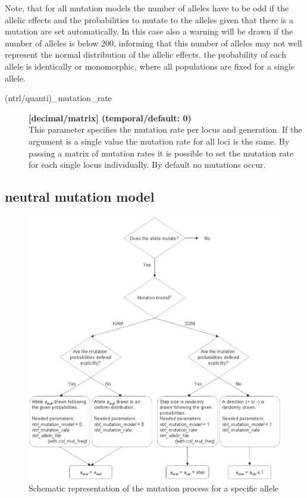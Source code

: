 \documentclass[letterpaper,12pt,oneside]{book}
\begin{document}
Note, that for all mutation models the number of alleles have to be odd if the allelic effects and the probabilities to mutate to the alleles given that there is a mutation are set automatically. In this case also a warning will be drawn if the number of alleles is below 200, informing that this number of alleles may not well represent the normal distribution of the allelic effects.
the probability of each allele is identically or monomorphic, where all populations are fixed for a single allele.   
\begin{description}
\item[(ntrl/quanti)\_mutation\_rate] \textbf{[decimal/matrix] (temporal/default: 0)}\\
This parameter specifies the mutation rate per locus and generation. If the argument is a single value the mutation rate for all loci is the same. By passing a matrix of mutation rates it is possible to set the mutation rate for each single locus individually. By default no mutations occur.

\end{description}
\subsection{neutral mutation model}

\begin{figure}[htbp]
	\centering
		\includegraphics[width=1\textwidth]{mutation-ntrl.pdf}
	\caption{Schematic representation of the mutation process for a specific allele}
	\label{fig:mutation-ntrl}
\end{figure}
\end{document}
